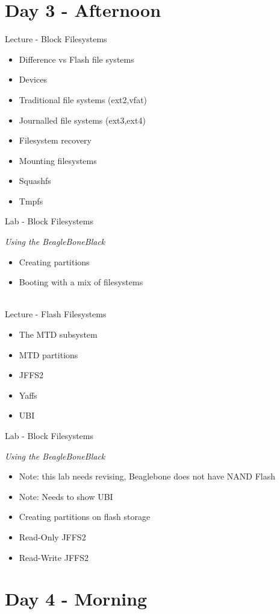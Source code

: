 \documentclass[a4paper,12pt,obeyspaces,spaces,hyphens]{article}
\begin{document}
\section{Day 3 - Afternoon}

\feagendatwocolumn
{Lecture - Block Filesystems}
{
  \begin{itemize}
  \item Difference vs Flash file systems
  \item Devices
  \item Traditional file systems (ext2,vfat)
  \item Journalled file systems (ext3,ext4)
  \item Filesystem recovery
  \item Mounting filesystems
  \item Squashfs
  \item Tmpfs
  \end{itemize}
}
{Lab - Block Filesystems}
{
  {\em Using the BeagleBoneBlack}
  \begin{itemize}
  \item Creating partitions
  \item Booting with a mix of filesystems
  \end{itemize}
}
\\
\feagendatwocolumn
{Lecture - Flash Filesystems}
{
  \begin{itemize}
  \item The MTD subsystem
  \item MTD partitions
  \item JFFS2
  \item Yaffs
  \item UBI
  \end{itemize}
}
{Lab - Block Filesystems}
{
  {\em Using the BeagleBoneBlack}
  \begin{itemize}
  \item Note: this lab needs revising, Beaglebone does not have NAND Flash
  \item Note: Needs to show UBI
  \item Creating partitions on flash storage
  \item Read-Only JFFS2
  \item Read-Write JFFS2
  \end{itemize}
}

\clearpage
\section{Day 4 - Morning}
\end{document}
